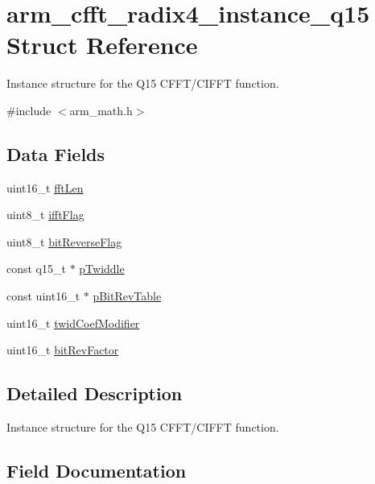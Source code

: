 \hypertarget{structarm__cfft__radix4__instance__q15}{}\section{arm\+\_\+cfft\+\_\+radix4\+\_\+instance\+\_\+q15 Struct Reference}
\label{structarm__cfft__radix4__instance__q15}


Instance structure for the Q15 C\+F\+F\+T/\+C\+I\+F\+FT function.  




{\ttfamily \#include $<$arm\+\_\+math.\+h$>$}

\subsection*{Data Fields}
\begin{DoxyCompactItemize}
\item 
uint16\+\_\+t \mbox{\hyperlink{structarm__cfft__radix4__instance__q15_ab8db3bbe7c61e6bb8ca2a55e3446e11a}{fft\+Len}}
\item 
uint8\+\_\+t \mbox{\hyperlink{structarm__cfft__radix4__instance__q15_ad6ca6e223f986ebfd94c5ee1e410aa73}{ifft\+Flag}}
\item 
uint8\+\_\+t \mbox{\hyperlink{structarm__cfft__radix4__instance__q15_a09a221a818c6d0e064557a99e2fe9a8b}{bit\+Reverse\+Flag}}
\item 
const q15\+\_\+t $\ast$ \mbox{\hyperlink{structarm__cfft__radix4__instance__q15_a7f19217cfa0370f9e518caa882265386}{p\+Twiddle}}
\item 
const uint16\+\_\+t $\ast$ \mbox{\hyperlink{structarm__cfft__radix4__instance__q15_a3b229432d381b0a511a9cdbe3aa74e78}{p\+Bit\+Rev\+Table}}
\item 
uint16\+\_\+t \mbox{\hyperlink{structarm__cfft__radix4__instance__q15_afe772e5b5001c9d8e85032115a8df5bf}{twid\+Coef\+Modifier}}
\item 
uint16\+\_\+t \mbox{\hyperlink{structarm__cfft__radix4__instance__q15_a33386d95319dc3ee7097b3a8e52e01ec}{bit\+Rev\+Factor}}
\end{DoxyCompactItemize}


\subsection{Detailed Description}
Instance structure for the Q15 C\+F\+F\+T/\+C\+I\+F\+FT function. 

\subsection{Field Documentation}
\mbox{\label{structarm__cfft__radix4__instance__q15_a09a221a818c6d0e064557a99e2fe9a8b}} 

